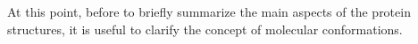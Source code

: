 
At this point, before to briefly summarize the main aspects of the protein structures, it is useful to clarify the concept of molecular conformations.




